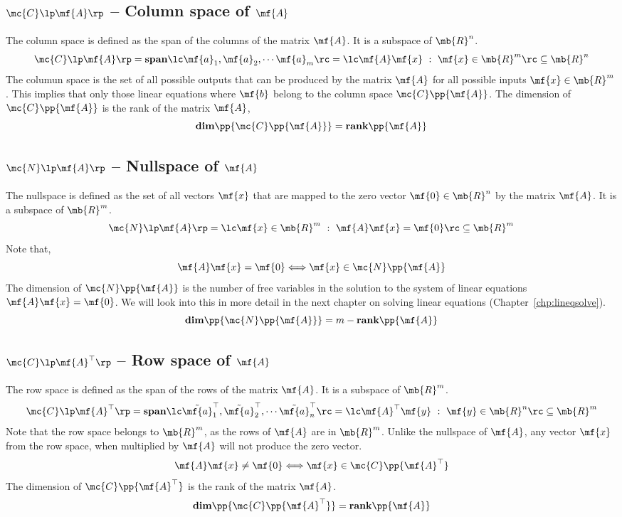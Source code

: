 \subsection{$\mc{C}\lp \mf{A} \rp$ -- Column space of $\mf{A}$}
The column space is defined as the span of the columns of the matrix $\mf{A}$. It is a subspace of $\mb{R}^{n}$.
\begin{equation}
    \mc{C}\lp \mf{A} \rp = \textbf{span}\lc \mf{a}_1, \mf{a}_2, \cdots \mf{a}_m \rc = \lc \mf{A}\mf{x} \,\, : \,\, \mf{x} \in \mb{R}^m \rc \subseteq \mb{R}^n
    \label{eq:ch-lintrans-colspace}
\end{equation}
The columun space is the set of all possible outputs that can be produced by the matrix $\mf{A}$ for all possible inputs $\mf{x} \in \mb{R}^m$. This implies that only those linear equations where $\mf{b}$ belong to the column space $\mc{C}\pp{\mf{A}}$. The dimension of $\mc{C}\pp{\mf{A}}$ is the rank of the matrix $\mf{A}$,
\[ \textbf{dim}\pp{\mc{C}\pp{\mf{A}}} = \textbf{rank}\pp{\mf{A}} \]

\subsection{$\mc{N}\lp \mf{A} \rp$ -- Nullspace of $\mf{A}$}
The nullspace is defined as the set of all vectors $\mf{x}$ that are mapped to the zero vector $\mf{0} \in \mb{R}^n$ by the matrix $\mf{A}$. It is a subspace of $\mb{R}^{m}$.
\begin{equation}
    \mc{N}\lp \mf{A} \rp = \lc \mf{x} \in \mb{R}^m \,\, : \,\, \mf{A}\mf{x} = \mf{0} \rc \subseteq \mb{R}^m
    \label{eq:ch-lintrans-nullspace}
\end{equation}
Note that,
\[ \mf{A}\mf{x} = \mf{0} \Longleftrightarrow \mf{x} \in \mc{N}\pp{\mf{A}} \]
The dimension of $\mc{N}\pp{\mf{A}}$ is the number of free variables in the solution to the system of linear equations $\mf{A}\mf{x} = \mf{0}$. We will look into this in more detail in the next chapter on solving linear equations (Chapter~\ref{chp:lineqsolve}).
\[ \textbf{dim}\pp{\mc{N}\pp{\mf{A}}} = m - \textbf{rank}\pp{\mf{A}} \]

\subsection{$\mc{C}\lp \mf{A}^\top \rp$ -- Row space of $\mf{A}$}
The row space is defined as the span of the rows of the matrix $\mf{A}$. It is a subspace of $\mb{R}^{m}$.
\begin{equation}
    \mc{C}\lp \mf{A}^\top \rp = \textbf{span}\lc \tilde{\mf{a}}_1^\top, \tilde{\mf{a}}_2^\top, \cdots \tilde{\mf{a}}_n^\top \rc = \lc \mf{A}^\top\mf{y} \,\, : \,\, \mf{y} \in \mb{R}^n \rc \subseteq \mb{R}^m
    \label{eq:ch-lintrans-rowspace}
\end{equation}
Note that the row space belongs to $\mb{R}^m$, as the rows of $\mf{A}$ are in $\mb{R}^m$. Unlike the nullspace of $\mf{A}$, any vector $\mf{x}$ from the row space, when multiplied by $\mf{A}$ will not produce the zero vector.
\[ \mf{A}\mf{x} \neq \mf{0} \Longleftrightarrow \mf{x} \in \mc{C}\pp{\mf{A}^\top} \]
The dimension of $\mc{C}\pp{\mf{A}^\top}$ is the rank of the matrix $\mf{A}$.
\[ \textbf{dim}\pp{\mc{C}\pp{\mf{A}^\top}} = \textbf{rank}\pp{\mf{A}} \]

